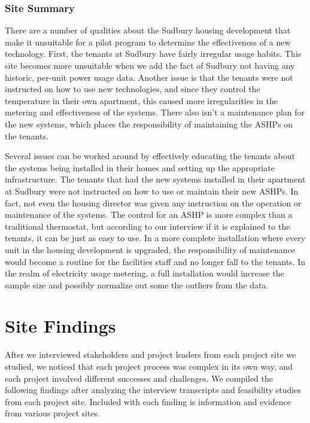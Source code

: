 \subsubsection{Site Summary}
\par There are a number of qualities about the Sudbury housing development that make it unsuitable for a pilot program to determine the effectiveness of a new technology. First, the tenants at Sudbury have fairly irregular usage habits. This site becomes more unsuitable when we add the fact of Sudbury not having any historic, per-unit power usage data. Another issue is that the tenants were not instructed on how to use new technologies, and since they control the temperature in their own apartment, this caused more irregularities in the metering and effectiveness of the systems. There also isn't a maintenance plan for the new systems, which places the responsibility of maintaining the ASHPs on the tenants.
\par Several issues can be worked around by effectively educating the tenants about the systems being installed in their homes and setting up the appropriate infrastructure. The tenants that had the new systems installed in their apartment at Sudbury were not instructed on how to use or maintain their new ASHPs. In fact, not even the housing director was given any instruction on the operation or maintenance of the systems. The control for an ASHP is more complex than a traditional thermostat, but according to our interview if it is explained to the tenants, it can be just as easy to use. In a more complete installation where every unit in the housing development is upgraded, the responsibility of maintenance would become a routine for the facilities staff and no longer fall to the tenants. In the realm of electricity usage metering, a full installation would increase the sample size and possibly normalize out some the outliers from the data. 

\section{Site Findings}
\par After we interviewed stakeholders and project leaders from each project site we studied, we noticed that each project process was complex in its own way, and each project involved different successes and challenges. We compiled the following findings after analyzing the interview transcripts and feasibility studies from each project site. Included with each finding is information and evidence from various project sites.\\

